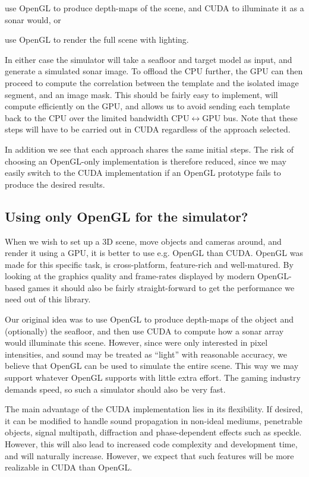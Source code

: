 \documentclass[
   article                                      %
 , 12pt                                         %
 , xelatex                                      %
 , bibtex                                       %
 , layout
]{common/mytemplate}
\begin{document}
\begin{itemize0}
\item use OpenGL to produce depth-maps of the scene, and CUDA to illuminate it as a sonar would, or
\item use OpenGL to render the full scene with lighting.
\end{itemize0}

In either case the simulator will take a seafloor and target model as input, and generate a simulated sonar image. To offload the CPU further, the GPU can then proceed to compute the correlation between the template and the isolated image segment, and an image mask. This should be fairly easy to implement, will compute efficiently on the GPU, and allows us to avoid sending each template back to the CPU over the limited bandwidth CPU$\leftrightarrow$GPU bus. Note that these steps will have to be carried out in CUDA regardless of the approach selected.

In addition we see that each approach shares the same initial steps. The risk of choosing an OpenGL-only implementation is therefore reduced, since we may easily switch to the CUDA implementation if an OpenGL prototype fails to produce the desired results.

\subsection{Using only OpenGL for the simulator?}


When we wish to set up a 3D scene, move objects and cameras around, and render it using a GPU, it is better to use e.g. OpenGL than CUDA. OpenGL was made for this specific task, is cross-platform, feature-rich and well-matured. By looking at the graphics quality and frame-rates displayed by modern OpenGL-based games it should also be fairly straight-forward to get the performance we need out of this library.

Our original idea was to use OpenGL to produce depth-maps of the object and (optionally) the seafloor, and then use CUDA to compute how a sonar array would illuminate this scene. However, since were only interested in pixel intensities, and sound may be treated as ``light'' with reasonable accuracy, we believe that OpenGL can be used to simulate the entire scene. This way we may support whatever OpenGL supports with little extra effort. The gaming industry demands speed, so such a simulator should also be very fast.

The main advantage of the CUDA implementation lies in its flexibility. If desired, it can be modified to handle sound propagation in non-ideal mediums, penetrable objects, signal multipath, diffraction and phase-dependent effects such as speckle. However, this will also lead to increased code complexity and development time, and  will naturally increase. However, we expect that such features will be more realizable in CUDA than OpenGL.  
\end{document}
